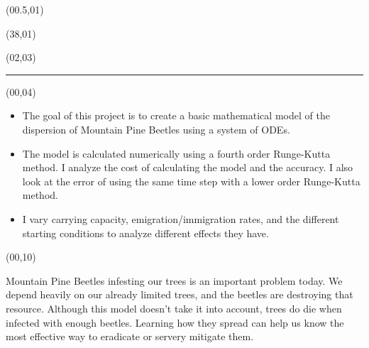 \documentclass{article}
\def\CHead#1{\begin{center}\noindent{\LARGE\color{DarkBlue} #1}\end{center}}
\renewcommand{\LARGE}{\fontsize{43}{54}\selectfont}
\begin{document}
\begin{textblock}{8}(00.5,01)
\begin{center}
\end{center}
\end{textblock}

\begin{textblock}{8}(38,01)
\begin{center}
\end{center}
\end{textblock}


\begin{textblock}{42}(02,03)
\begin{center}
\rule{1200pt}{7pt}
\end{center}
\end{textblock}



\begin{textblock}{10}(00,04)
\CHead{Introduction}            %
\begin{itemize}
\item The goal of this project is to create a basic mathematical model of the dispersion of Mountain Pine Beetles using a system of ODEs.
\item The model is calculated numerically using a fourth order Runge-Kutta method. I analyze the cost of calculating the model and the accuracy. I also look at the error of using the same time step with a lower order Runge-Kutta method.
\item I vary carrying capacity, emigration/immigration rates, and the different starting conditions to analyze different effects they have.
\end{itemize}
\end{textblock}



\begin{textblock}{10}(00,10)
\CHead{Motivation}
Mountain Pine Beetles infesting our trees is an important problem today. We depend heavily on our already limited trees, and the beetles are destroying that resource. Although this model doesn't take it into account, trees do die when infected with enough beetles. Learning how they spread can help us know the most effective way to eradicate or servery mitigate them.
\end{textblock}
\end{document}
